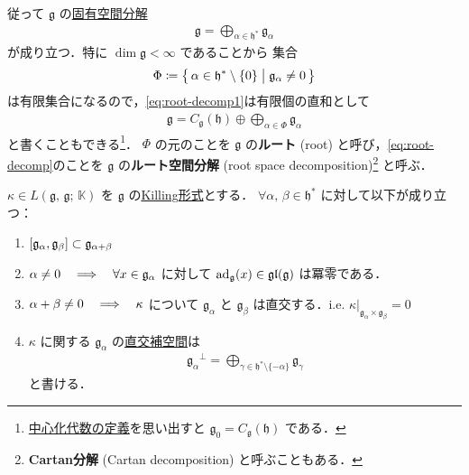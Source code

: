\documentclass[rep_main]{subfiles}
\begin{document}
従って $\mathfrak{g}$ の\hyperref[thm:eigen-decomp-1]{固有空間分解}
\begin{align}
	\label{eq:root-decomp1}
	\mathfrak{g} = \bigoplus_{\alpha \in \mathfrak{h}^*} \mathfrak{g}_\alpha
\end{align}
が成り立つ．特に $\dim \mathfrak{g} < \infty$ であることから
集合
\begin{align}
	\Phi \coloneqq \bigl\{\, \alpha \in \mathfrak{h}^* \setminus \{0\} \bigm| \mathfrak{g}_\alpha \neq 0 \,\bigr\} 
\end{align}
は有限集合になるので，\eqref{eq:root-decomp1}は有限個の直和として
\begin{align}
	\label{eq:root-decomp}
	\mathfrak{g} = C_{\mathfrak{g}}(\mathfrak{h}) \oplus \bigoplus_{\alpha \in \Phi} \mathfrak{g}_\alpha
\end{align}
と書くこともできる\footnote{\hyperref[def:normalizer-LieAlg]{中心化代数の定義}を思い出すと $\mathfrak{g}_0 = C_{\mathfrak{g}}(\mathfrak{h})$ である．}．
$\Phi$ の元のことを $\mathfrak{g}$ の\textbf{ルート} (root) と呼び，\eqref{eq:root-decomp}のことを $\mathfrak{g}$ の\textbf{ルート空間分解} (root space decomposition)\footnote{\textbf{Cartan分解} (Cartan decomposition) と呼ぶこともある．} と呼ぶ．

\begin{myprop}[label=prop:root-decomp-basic1]{}
	$\kappa \in L(\mathfrak{g},\, \mathfrak{g};\, \mathbb{K})$ を $\mathfrak{g}$ の\hyperref[def:Killing-form]{Killing形式}とする．
	$\forall \alpha,\, \beta \in \mathfrak{h}^*$ に対して以下が成り立つ：
	\begin{enumerate}
		\item $\comm{\mathfrak{g}_\alpha}{\mathfrak{g}_\beta} \subset \mathfrak{g}_{\alpha + \beta}$
		\item $\alpha \neq 0 \quad \Longrightarrow \quad \forall x \in \mathfrak{g}_\alpha$ に対して $\operatorname{ad}_{\mathfrak{g}}(x) \in \mathfrak{gl}(\mathfrak{g})$ は冪零である．
		\item $\alpha + \beta \neq 0 \quad \Longrightarrow \quad \kappa$ について $\mathfrak{g}_\alpha$ と $\mathfrak{g}_\beta$ は直交する．i.e. $\kappa|_{\mathfrak{g}_\alpha \times \mathfrak{g}_\beta} = 0$
		\item $\kappa$ に関する $\mathfrak{g}_\alpha$ の\hyperref[def:radical-bilinear]{直交補空間}は
		\begin{align}
			\mathfrak{g}_\alpha{}^\perp = \bigoplus_{\gamma \in \mathfrak{h}^* \setminus \{-\alpha\}} \mathfrak{g}_{\gamma}
		\end{align}
		と書ける．
	\end{enumerate}
\end{myprop}
\end{document}
